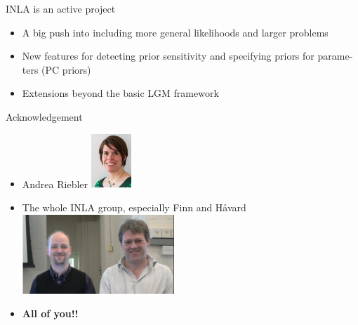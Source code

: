 \documentclass[
  ignorenonframetext,
  handout]{beamer}
\begin{document}
\begin{frame}{INLA is an active project}
\protect\hypertarget{inla-is-an-active-project}{}
\begin{itemize}
\item
  A big push into including more general likelihoods and larger problems
\item
  New features for detecting prior sensitivity and specifying priors for
  parame- ters (PC priors)
\item
  Extensions beyond the basic LGM framework
\end{itemize}
\end{frame}

\begin{frame}{Acknowledgement}
\protect\hypertarget{acknowledgement}{}
\begin{itemize}
\item
  Andrea Riebler
  \includegraphics[width=0.12\textwidth,height=\textheight]{graphics/andrerie.jpg}
\item
  The whole INLA group, especially Finn and Håvard
  \includegraphics[width=0.45\textwidth,height=\textheight]{graphics/Finn_Havard.png}
\item
  \textbf{All of you!!}
\end{itemize}
\end{frame}
\end{document}
